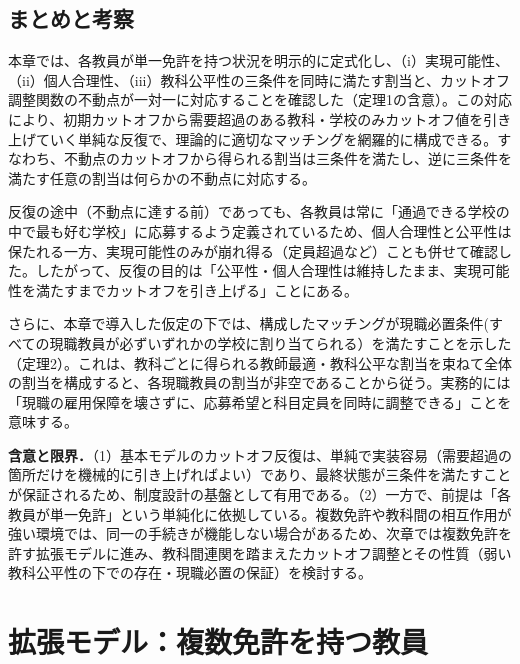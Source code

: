 \documentclass[12pt, a4paper]{article}
\theoremstyle{definition}
\theoremstyle{remark}
\theoremstyle{plain}
\begin{document}


\subsection{まとめと考察}
本章では、各教員が単一免許を持つ状況を明示的に定式化し、（i）実現可能性、（ii）個人合理性、（iii）教科公平性の三条件を同時に満たす割当と、カットオフ調整関数の不動点が一対一に対応することを確認した（定理1の含意）。この対応により、初期カットオフから需要超過のある教科・学校のみカットオフ値を引き上げていく単純な反復で、理論的に適切なマッチングを網羅的に構成できる。すなわち、不動点のカットオフから得られる割当は三条件を満たし、逆に三条件を満たす任意の割当は何らかの不動点に対応する。

反復の途中（不動点に達する前）であっても、各教員は常に「通過できる学校の中で最も好む学校」に応募するよう定義されているため、個人合理性と公平性は保たれる一方、実現可能性のみが崩れ得る（定員超過など）ことも併せて確認した。したがって、反復の目的は「公平性・個人合理性は維持したまま、実現可能性を満たすまでカットオフを引き上げる」ことにある。

さらに、本章で導入した仮定の下では、構成したマッチングが現職必置条件(すべての現職教員が必ずいずれかの学校に割り当てられる）を満たすことを示した（定理2）。これは、教科ごとに得られる教師最適・教科公平な割当を束ねて全体の割当を構成すると、各現職教員の割当が非空であることから従う。実務的には「現職の雇用保障を壊さずに、応募希望と科目定員を同時に調整できる」ことを意味する。

\noindent\textbf{含意と限界．}（1）基本モデルのカットオフ反復は、単純で実装容易（需要超過の箇所だけを機械的に引き上げればよい）であり、最終状態が三条件を満たすことが保証されるため、制度設計の基盤として有用である。（2）一方で、前提は「各教員が単一免許」という単純化に依拠している。複数免許や教科間の相互作用が強い環境では、同一の手続きが機能しない場合があるため、次章では複数免許を許す拡張モデルに進み、教科間連関を踏まえたカットオフ調整とその性質（弱い教科公平性の下での存在・現職必置の保証）を検討する。


\section{拡張モデル：複数免許を持つ教員}
\end{document}
